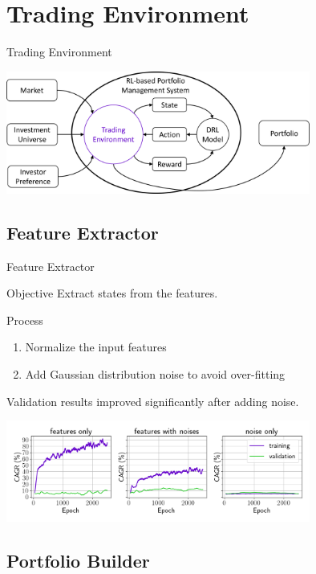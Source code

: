 \section{Trading Environment}

\begin{frame}{Trading Environment}
   \tableofcontents[sectionstyle=show/hide, hideothersubsections]
\begin{center}
  \includegraphics[width=10cm]{images/trading_environment.png}
\end{center}
\end{frame}
\subsection{Feature Extractor}
\begin{frame}{Feature Extractor}
\begin{block}{Objective}
Extract states from the features.
\end{block}
Process
\begin{enumerate}
    \item {
    Normalize the input features}
    \item{Add Gaussian distribution noise to avoid over-fitting}
\end{enumerate}
\alert{Validation results improved significantly after adding noise.}
\begin{center}
  \includegraphics[width=10cm]{images/compare_noise.png}
\end{center}
\end{frame}
\subsection{Portfolio Builder}

